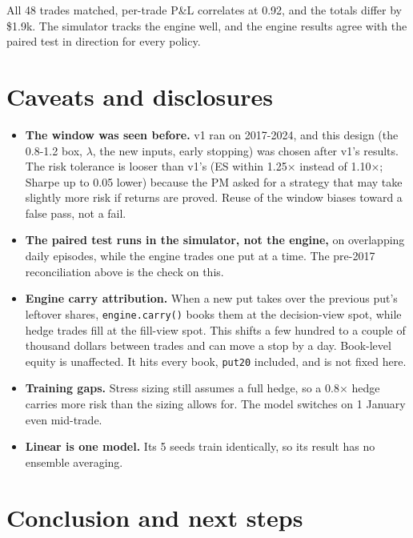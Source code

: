 \documentclass{article}
\begin{document}
All 48 trades matched, per-trade P\&L correlates at 0.92, and the totals differ by \$1.9k. The simulator tracks the engine well, and the engine results agree with the paired test in direction for every policy.

\section{Caveats and disclosures}

\begin{itemize}

\item \textbf{The window was seen before.} v1 ran on 2017-2024, and this design (the 0.8-1.2 box, \ensuremath{\lambda}, the new inputs, early stopping) was chosen after v1's results. The risk tolerance is looser than v1's (ES within 1.25\ensuremath{\times} instead of 1.10\ensuremath{\times}; Sharpe up to 0.05 lower) because the PM asked for a strategy that may take slightly more risk if returns are proved. Reuse of the window biases toward a false pass, not a fail.

\item \textbf{The paired test runs in the simulator, not the engine,} on overlapping daily episodes, while the engine trades one put at a time. The pre-2017 reconciliation above is the check on this.

\item \textbf{Engine carry attribution.} When a new put takes over the previous put's leftover shares, \texttt{engine.\allowbreak{}carry()} books them at the decision-view spot, while hedge trades fill at the fill-view spot. This shifts a few hundred to a couple of thousand dollars between trades and can move a stop by a day. Book-level equity is unaffected. It hits every book, \texttt{put20} included, and is not fixed here.

\item \textbf{Training gaps.} Stress sizing still assumes a full hedge, so a 0.8\ensuremath{\times} hedge carries more risk than the sizing allows for. The model switches on 1 January even mid-trade.

\item \textbf{Linear is one model.} Its 5 seeds train identically, so its result has no ensemble averaging.

\end{itemize}

\section{Conclusion and next steps}
\end{document}
